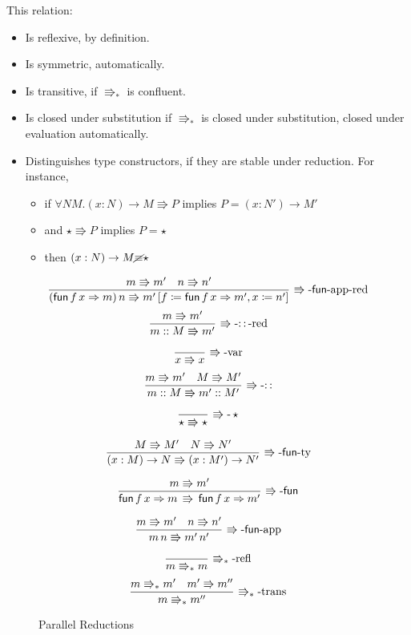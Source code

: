 This relation:
\begin{itemize}
\item Is reflexive, by definition.
\item Is symmetric, automatically.
\item Is transitive, if $\Rrightarrow_{\ast}$ is confluent.
\item Is closed under substitution if $\Rrightarrow_{\ast}$ is closed under substitution, closed under evaluation automatically.
\item Distinguishes type constructors, if they are stable under reduction.
For instance,
\begin{itemize}
\item if $\forall NM.\left(x:N\right)\rightarrow M\Rrightarrow P$ implies $P=\left(x:N'\right)\rightarrow M'$
\item and $\star\Rrightarrow P$ implies $P=\star$
\item then $\left(x:N\right)\rightarrow M\cancel{\equiv}\star$
\end{itemize}
\end{itemize}
\begin{figure}
\[
\frac{m\Rrightarrow m'\quad n\Rrightarrow n'}{\left(\mathsf{fun}\,f\,x\Rightarrow m\right)n\Rrightarrow m'\left[f\coloneqq\mathsf{fun}\,f\,x\Rightarrow m',x\coloneqq n'\right]}\,\operatorname{\Rrightarrow-\mathsf{fun}-app-red}
\]
\[
\frac{m\Rrightarrow m'}{m::M\Rrightarrow m'}\,\operatorname{\Rrightarrow-::-red}
\]
 
\[
\frac{\,}{x\Rrightarrow x}\,\operatorname{\Rrightarrow-var}
\]
\[
\frac{m\Rrightarrow m'\quad M\Rrightarrow M'}{m::M\Rrightarrow m'::M'}\,\operatorname{\Rrightarrow-::}
\]
 
\[
\frac{\,}{\star\Rrightarrow\star}\,\operatorname{\Rrightarrow-}\star
\]
 
\[
\frac{M\Rrightarrow M'\quad N\Rrightarrow N'}{\left(x:M\right)\rightarrow N\Rrightarrow\left(x:M'\right)\rightarrow N'}\,\operatorname{\Rrightarrow-\mathsf{fun}-ty}
\]
 
\[
\frac{m\Rrightarrow m'}{\mathsf{fun}\,f\,x\Rightarrow m\,\Rrightarrow\,\mathsf{fun}\,f\,x\Rightarrow m'}\,\operatorname{\Rrightarrow-\mathsf{fun}}
\]
 
\[
\frac{m\Rrightarrow m'\quad n\Rrightarrow n'}{m\,n\Rrightarrow m'\,n'}\,\operatorname{\Rrightarrow-\mathsf{fun}-app}
\]
 
\[
\frac{\,}{m\Rrightarrow_{\ast}m}\,\operatorname{\Rrightarrow_{\ast}-refl}
\]
\[
\frac{m\Rrightarrow_{\ast}m'\quad m'\Rrightarrow m''}{m\Rrightarrow_{\ast}m''}\,\operatorname{\Rrightarrow_{\ast}-trans}
\]
 
\caption{\SLang{} Parallel Reductions}
\label{fig:surface-reduction}
\end{figure}

